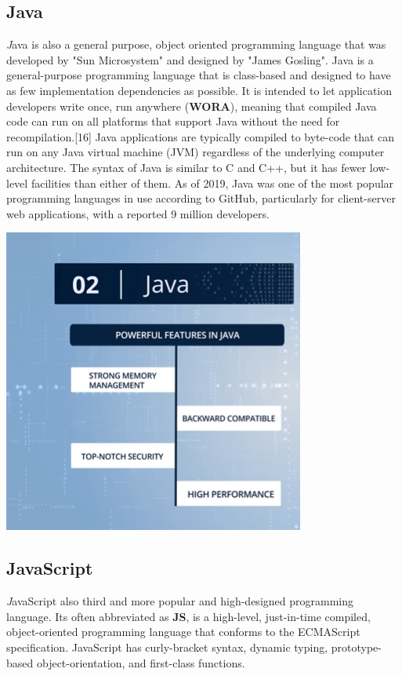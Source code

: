 \documentclass[paper = A5, headinclude, parskip = full, oneside, font = 11 pt]{report}
\begin{document}
\subsection{Java}
\emph{\textit{\large{J}}}ava is also a general purpose, object oriented programming language that was developed by "Sun Microsystem" and designed by "James Gosling". Java is a general-purpose programming language that is class-based and designed to have as few implementation dependencies as possible. It is intended to let application developers write once, run anywhere (\textbf{WORA}), meaning that compiled Java code can run on all platforms that support Java without the need for recompilation.[16] Java applications are typically compiled to byte-code that can run on any Java virtual machine (JVM) regardless of the underlying computer architecture. The syntax of Java is similar to C and C++, but it has fewer low-level facilities than either of them. As of 2019, Java was one of the most popular programming languages in use according to GitHub, particularly for client-server web applications, with a reported 9 million developers.
\begin{center}
 \includegraphics[width = 140 pt]{Java.png}
\end{center}

\subsection{JavaScript}
\emph{\textit{\large{J}}}avaScript also third and more popular and high-designed programming language. Its often abbreviated as \textbf{JS}, is a high-level, just-in-time compiled, object-oriented programming language that conforms to the ECMAScript specification. JavaScript has curly-bracket syntax, dynamic typing, prototype-based object-orientation, and first-class functions.
\end{document}
